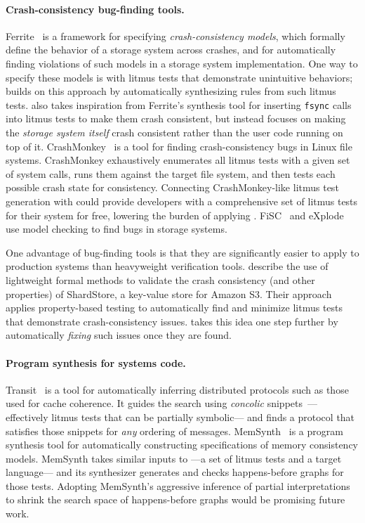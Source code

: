 \paragraph{Crash-consistency bug-finding tools.}
Ferrite~\cite{bornholt:ferrite} is a framework for specifying \emph{crash-consistency models},
which formally define the behavior of a storage system across crashes,
and for automatically finding violations of such models in a storage system implementation.
One way to specify these models is with litmus tests that demonstrate unintuitive behaviors;
\depsynth builds on this approach by automatically synthesizing rules from such litmus tests.
\depsynth also takes inspiration from Ferrite's synthesis tool
for inserting \texttt{fsync} calls into litmus tests to make them crash consistent,
but instead focuses on making the \emph{storage system itself} crash consistent
rather than the user code running on top of it.
CrashMonkey~\cite{mohan:crashmonkey} is a tool for finding crash-consistency bugs in Linux file systems.
CrashMonkey exhaustively enumerates all litmus tests with a given set of system calls,
runs them against the target file system,
and then tests each possible crash state for consistency.
Connecting CrashMonkey-like litmus test generation with \depsynth
could provide developers with a comprehensive set of litmus tests for their system for free,
lowering the burden of applying \depsynth.
FiSC~\cite{yang:fisc} and eXplode~\cite{yang:explode}
use model checking to find bugs in storage systems.

One advantage of bug-finding tools is that they are significantly easier to apply to production systems
than heavyweight verification tools.
\citet{bornholt:s3} describe the use of lightweight formal methods
to validate the crash consistency (and other properties)
of ShardStore, a key-value store for Amazon S3.
Their approach applies property-based testing to automatically find and minimize litmus tests
that demonstrate crash-consistency issues.
\depsynth takes this idea one step further by automatically \emph{fixing} such issues once they are found.

\paragraph{Program synthesis for systems code.}
Transit~\cite{udupa:transit} is a tool for automatically inferring distributed protocols
such as those used for cache coherence.
It guides the search using \emph{concolic} snippets~\cite{sen:concolic}---%
effectively litmus tests that can be partially symbolic---%
and finds a protocol that satisfies those snippets for \emph{any} ordering of messages.
MemSynth~\cite{bornholt:memsynth} is a program synthesis tool for
automatically constructing specifications of memory consistency models.
MemSynth takes similar inputs to \depsynth---a set of litmus tests and a target language---%
and its synthesizer generates and checks happens-before graphs for those tests.
Adopting MemSynth's aggressive inference of partial interpretations~\cite{torlak:kodkod}
to shrink the search space of happens-before graphs would be promising future work.

